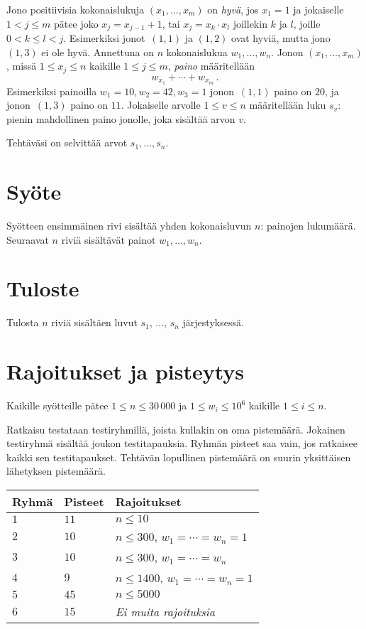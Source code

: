 
\noindent
Jono positiivisia kokonaislukuja $(x_1,\ldots,x_m)$ on \emph{hyvä}, jos 
$x_1 = 1$ ja jokaiselle $1 < j \leq m$ pätee joko 
$x_j=x_{j-1}+1$, tai $x_j=x_k\cdot x_l$ joillekin $k$ ja $l$, joille 
$0< k\leq l< j$.
Esimerkiksi jonot~$(1,1)$ ja $(1,2)$ ovat hyviä, mutta jono~$(1,3)$ ei ole hyvä.
Annettuna on $n$ kokonaislukua $w_1,\ldots,w_n$.
Jonon
$(x_1,\ldots,x_m)$, missä $1\leq x_j \leq n$ kaikille $1\leq j\leq m$, 
\emph{paino} määritellään
\[ w_{x_1} +\cdots +w_{x_m}\,.\]
Esimerkiksi painoilla $w_1=10, w_2=42,w_3= 1$ jonon~$(1,1)$ paino on $20$, ja 
jonon~$(1,3)$ paino on $11$. 
Jokaiselle arvolle $1\leq v\leq n$ määritellään luku $s_v$: pienin mahdollinen paino 
jonolle, joka sisältää arvon $v$.

Tehtäväsi on selvittää arvot $s_1,\ldots, s_n$.

\section*{Syöte}

Syötteen ensimmäinen rivi sisältää yhden kokonaisluvun $n$: painojen lukumäärä.
Seuraavat $n$ riviä sisältävät painot $w_1, \ldots, w_n$.

\section*{Tuloste}

Tulosta $n$ riviä sisältäen luvut $s_1$, $\ldots$, $s_n$ järjestyksessä.

\section*{Rajoitukset ja pisteytys}

Kaikille syötteille pätee
$1\leq n \leq 30\,000$ %
ja
$1\leq w_i \leq 10^6$ kaikille $1\leq i \leq n$.%


Ratkaisu testataan testiryhmillä, joista kullakin on oma pistemäärä.
Jokainen testiryhmä sisältää joukon testitapauksia.
Ryhmän pisteet saa vain, jos ratkaisee kaikki sen testitapaukset.
Tehtävän lopullinen pistemäärä on suurin yksittäisen lähetyksen pistemäärä.

\medskip
\begin{tabular}{lll}
Ryhmä & Pisteet & Rajoitukset \\\hline
$1$   & $11$ & $n\leq 10$ \\
$2$   & $10$ & $n\leq 300$, $w_1=\cdots=w_n = 1$ \\
$3$   & $10$ & $n\leq 300$, $w_1=\cdots=w_n$ \\ %
$4$   & $9$ & $n\leq 1400$, $w_1=\cdots=w_n = 1$ \\
$5$   & $45$ & $n\leq 5000$\\
$6$   & $15$ & \emph{Ei muita rajoituksia}
\end{tabular}
